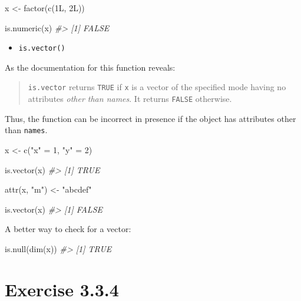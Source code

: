 \documentclass[
]{book}
\newenvironment{Shaded}{\begin{snugshade}}{\end{snugshade}}
\newcommand{\CommentTok}[1]{\textcolor[rgb]{0.56,0.35,0.01}{\textit{#1}}}
\newcommand{\DecValTok}[1]{\textcolor[rgb]{0.00,0.00,0.81}{#1}}
\newcommand{\FunctionTok}[1]{\textcolor[rgb]{0.00,0.00,0.00}{#1}}
\newcommand{\NormalTok}[1]{#1}
\newcommand{\OtherTok}[1]{\textcolor[rgb]{0.56,0.35,0.01}{#1}}
\newcommand{\StringTok}[1]{\textcolor[rgb]{0.31,0.60,0.02}{#1}}
\providecommand{\tightlist}{%
  \setlength{\itemsep}{0pt}\setlength{\parskip}{0pt}}
\begin{document}
\begin{Shaded}
\begin{Highlighting}[]
\NormalTok{x }\OtherTok{\textless{}{-}} \FunctionTok{factor}\NormalTok{(}\FunctionTok{c}\NormalTok{(1L, 2L))}

\FunctionTok{is.numeric}\NormalTok{(x)}
\CommentTok{\#\textgreater{} [1] FALSE}
\end{Highlighting}
\end{Shaded}

\begin{itemize}
\tightlist
\item
  \texttt{is.vector()}
\end{itemize}

As the documentation for this function reveals:

\begin{quote}
\texttt{is.vector} returns \texttt{TRUE} if \texttt{x} is a vector of the specified mode having no attributes \emph{other than names}. It returns \texttt{FALSE} otherwise.
\end{quote}

Thus, the function can be incorrect in presence if the object has attributes other than \texttt{names}.

\begin{Shaded}
\begin{Highlighting}[]
\NormalTok{x }\OtherTok{\textless{}{-}} \FunctionTok{c}\NormalTok{(}\StringTok{"x"} \OtherTok{=} \DecValTok{1}\NormalTok{, }\StringTok{"y"} \OtherTok{=} \DecValTok{2}\NormalTok{)}

\FunctionTok{is.vector}\NormalTok{(x)}
\CommentTok{\#\textgreater{} [1] TRUE}

\FunctionTok{attr}\NormalTok{(x, }\StringTok{"m"}\NormalTok{) }\OtherTok{\textless{}{-}} \StringTok{"abcdef"}

\FunctionTok{is.vector}\NormalTok{(x)}
\CommentTok{\#\textgreater{} [1] FALSE}
\end{Highlighting}
\end{Shaded}

A better way to check for a vector:

\begin{Shaded}
\begin{Highlighting}[]
\FunctionTok{is.null}\NormalTok{(}\FunctionTok{dim}\NormalTok{(x))}
\CommentTok{\#\textgreater{} [1] TRUE}
\end{Highlighting}
\end{Shaded}

\hypertarget{exercise-3.3.4}{%
\section{Exercise 3.3.4}\label{exercise-3.3.4}}
\end{document}
